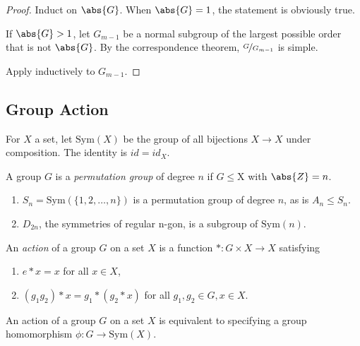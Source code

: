 \begin{proof}
    Induct on \(\abs{G}\). When \(\abs{G} =1\), the statement is obviously true.

    If \(\abs{G} > 1\), let \(G_{m - 1}\) be a normal subgroup of the largest possible order that is not \(\abs{G} \). By the correspondence theorem, \(\nicefrac{G}{G_{m - 1}}\) is simple.

    Apply inductively to \(G_{m-1}\).
\end{proof}

\subsection{Group Action}
\leavevmode
\begin{definition}{}{}
    For \(X\) a set, let \(\mathrm{Sym}(X)\) be the group of all bijections \(X \to X\) under composition. The identity is \(id = id_X\).

    A group \(G\) is a \textit{permutation group} of degree \(n\) if \(G \leq \mathrm{X}\) with \(\abs{Z} = n\).
\end{definition}
\begin{example}
    \leavevmode
    \begin{enumerate}
    \item \(S_n = \mathrm{Sym}(\{1,2, \ldots , n \})\) is a permutation group of degree \(n\), as is \(A_n \leq S_n\).
    \item \(D_{2n}\), the symmetries of regular n-gon, is a subgroup of \(\mathrm{Sym}(n)\).
    \end{enumerate}
\end{example}
\begin{definition}{}{}
    An \textit{action} of a group \(G\) on a set \(X\) is a function \(*:G\times X \to  X\) satisfying
    \begin{enumerate}
        \item \(e*x = x\) for all \(x \in X\),
        \item \((g_1g_2)*x = g_1*(g_2*x)\) for all \(g_1, g_2 \in G, x \in X\).
    \end{enumerate}
\end{definition}
\begin{proposition}{}{}
    An action of a group \(G\) on a set \(X\) is equivalent to specifying a group homomorphism \(\phi: G \to \mathrm{Sym}(X)\).
\end{proposition}
